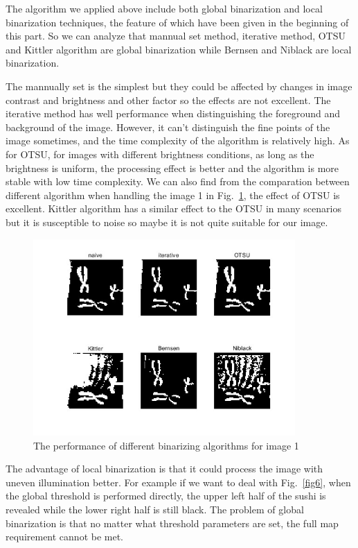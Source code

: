 \documentclass[hyperref]{article}
\theoremstyle{nonumberplain}
\begin{document}
	\hspace{1.0em}
	The algorithm we applied above include both global binarization and local binarization techniques, the feature of which have been given in the beginning of this part. So we can analyze that mannual set method, iterative method, OTSU and Kittler algorithm are global binarization while Bernsen and Niblack are local binarization.  
	
	The mannually set is the simplest but they could be affected by changes in image contrast and brightness and other factor so the effects are not excellent. The iterative method has well performance when distinguishing the foreground and background of the image. However, it can’t distinguish the fine points of the image sometimes, and the time complexity of the algorithm is relatively high. As for OTSU, for images with different brightness conditions, as long as the brightness is uniform, the processing effect is better and the algorithm is more stable with low time complexity. We can also find from the comparation between different algorithm when handling the image 1 in Fig.~\ref{fig5}, the effect of OTSU is excellent. Kittler algorithm has a similar effect to the OTSU in many scenarios but it is susceptible to noise so maybe it is not quite suitable for our image.
	
	\begin{figure}[htbp]
		\centering
			\centering
			\includegraphics[width=10cm]{fig5.jpg}
		\caption{The performance of different binarizing algorithms for image 1}
		\label{fig5}
	\end{figure}
	
	The advantage of local binarization is that it could process the image with uneven illumination better. For example if we want to deal with Fig.~\ref{fig6}, when the global threshold is performed directly, the upper left half of the sushi is revealed while the lower right half is still black. The problem of global binarization is that no matter what threshold parameters are set, the full map requirement cannot be met.
	
\end{document}
